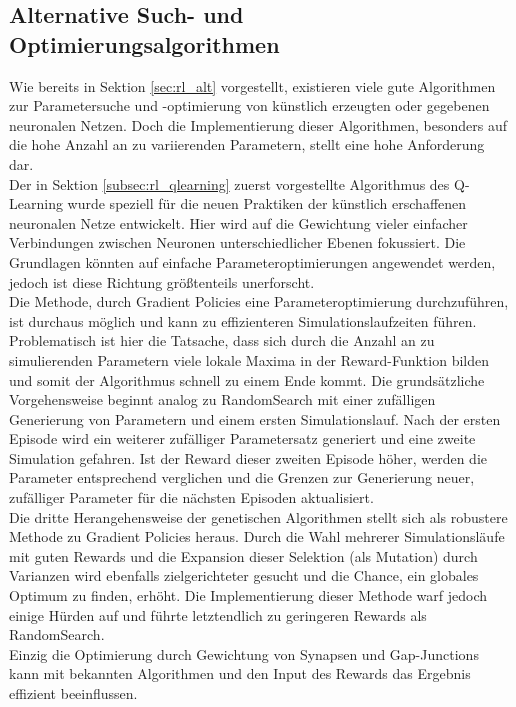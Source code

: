 	\subsection{Alternative Such- und Optimierungsalgorithmen}
		Wie bereits in Sektion \ref{sec:rl_alt} vorgestellt, existieren  viele gute Algorithmen zur Parametersuche und -optimierung von künstlich erzeugten oder gegebenen neuronalen Netzen. Doch die Implementierung dieser Algorithmen, besonders auf die hohe Anzahl an zu variierenden Parametern, stellt eine hohe Anforderung dar.\\
		Der in Sektion \ref{subsec:rl_qlearning} zuerst vorgestellte Algorithmus des Q-Learning wurde speziell für die neuen Praktiken der künstlich erschaffenen neuronalen Netze entwickelt. Hier wird auf die Gewichtung vieler einfacher Verbindungen zwischen Neuronen unterschiedlicher Ebenen fokussiert. Die Grundlagen könnten auf einfache Parameteroptimierungen angewendet werden, jedoch ist diese Richtung größtenteils unerforscht.\\
		Die Methode, durch Gradient Policies eine Parameteroptimierung durchzuführen, ist durchaus möglich und kann zu effizienteren Simulationslaufzeiten führen. Problematisch ist hier die Tatsache, dass sich durch die Anzahl an zu simulierenden Parametern viele lokale Maxima in der Reward-Funktion bilden und somit der Algorithmus schnell zu einem Ende kommt. Die grundsätzliche Vorgehensweise beginnt analog zu RandomSearch mit einer zufälligen Generierung von Parametern und einem ersten Simulationslauf. Nach der ersten Episode wird ein weiterer zufälliger Parametersatz generiert und eine zweite Simulation gefahren. Ist der Reward dieser zweiten Episode höher, werden die Parameter entsprechend verglichen und die Grenzen zur Generierung neuer, zufälliger Parameter für die nächsten Episoden aktualisiert.\\
		Die dritte Herangehensweise der genetischen Algorithmen stellt sich als robustere Methode zu Gradient Policies heraus. Durch die Wahl mehrerer Simulationsläufe mit guten Rewards und die Expansion dieser Selektion (als Mutation) durch Varianzen wird ebenfalls zielgerichteter gesucht und die Chance, ein globales Optimum zu finden, erhöht. Die Implementierung dieser Methode warf jedoch einige Hürden auf und führte letztendlich zu geringeren Rewards als RandomSearch.\\
		Einzig die Optimierung durch Gewichtung von Synapsen und Gap-Junctions kann mit bekannten Algorithmen und den Input des Rewards das Ergebnis effizient beeinflussen.

